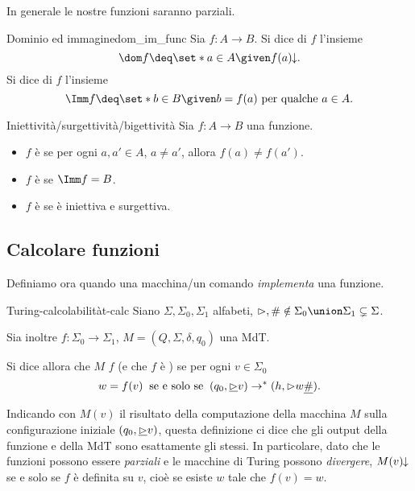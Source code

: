 In generale le nostre funzioni saranno parziali.

\begin{definition}
    {Dominio ed immagine}{dom_im_func}
    Sia $f : A \to B$. Si dice  di $f$ l'insieme \[
        \dom f \deq \set*{a \in A \given f(a)\conv}.
    \]  Si dice  di $f$ l'insieme \[
        \Imm f \deq \set*{b \in B \given b = f(a) \text{ per qualche } a \in A}.
    \]
\end{definition}

\begin{definition}
    {Iniettività/surgettività/bigettività}{}
    Sia $f : A \to B$ una funzione. 
    \begin{itemize}
        \item $f$ è  se per ogni $a, a' \in A$, $a \neq a'$, allora $f(a) \neq f(a')$.
        \item $f$ è  se $\Imm f = B$.
        \item $f$ è  se è iniettiva e surgettiva.     
    \end{itemize}
\end{definition}

\subsection*{Calcolare funzioni}

Definiamo ora quando una macchina/un comando \emph{implementa} una funzione.

\begin{definition}
    {Turing-calcolabilità}{t-calc}
    Siano $\Sigma, \Sigma_0, \Sigma_1$ alfabeti, $\resp, \# \notin \Sigma_0 \union \Sigma_1 \subsetneq \Sigma$.

    Sia inoltre $f : \Sigma_0 \to \Sigma_1$, $M = (Q, \Sigma, \delta, q_0)$ una MdT.

    Si dice allora che $M$  $f$ (e che $f$ è ) se per ogni $v \in \Sigma_0$ \[
        w = f(v) \;\;\text{se e solo se}\;\; (q_0, \underline{{\vartriangleright}}v) \to^\ast (h, {\vartriangleright} w \underline{\#}).
    \]
\end{definition}

Indicando con $M(v)$ il risultato della computazione della macchina $M$ sulla configurazione iniziale $(q_0, \underline{{\vartriangleright}}v)$, questa definizione ci dice che gli output della funzione e della MdT sono esattamente gli stessi. 
In particolare, dato che le funzioni possono essere \emph{parziali} e le macchine di Turing possono \emph{divergere}, $M(v)\!\!\downarrow$ se e solo se $f$ è definita su $v$, cioè se esiste $w$ tale che $f(v) = w$.

